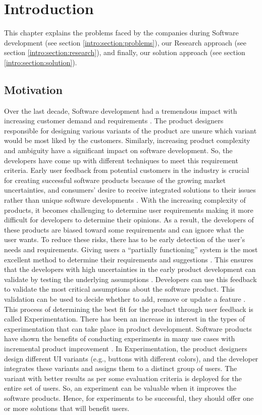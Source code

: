 \chapter{Introduction} \label{chap:intro}
This chapter explains the problems faced by the companies during Software development (see section \ref{intro:section:problems}), our Research approach (see section \ref{intro:section:research}), and finally, our solution approach (see section \ref{intro:section:solution}).

\section{Motivation}
Over the last decade, Software development had a tremendous impact with increasing customer demand and requirements \cite{article:swdemand:ahmed}. 
The product designers responsible for designing various variants of the product are unsure which variant would be most liked by the customers.
Similarly, increasing product complexity and ambiguity have a significant impact on software development. 
So, the developers have come up with different techniques to meet this requirement criteria.
Early user feedback from potential customers in the industry is crucial for creating successful software products because of the growing market uncertainties, and consumers' desire to receive integrated solutions to their issues rather than unique software developments \cite{misc:businessmodels:teece}.
With the increasing complexity of products, it becomes challenging to determine user requirements making it more difficult for developers to determine their opinions.
As a result, the developers of these products are biased toward some requirements and can ignore what the user wants. 
To reduce these risks, there has to be early detection of the user's needs and requirements. 
Giving users a ``partially functioning'' system is the most excellent method to determine their requirements and suggestions \cite{journal:prototyping:davis}.
This ensures that the developers with high uncertainties in the early product development can validate by testing the underlying assumptions \cite{misc:lean:steve}.
Developers can use this feedback to validate the most critical assumptions about the software product. 
This validation can be used to decide whether to add, remove or update a feature \cite{article:experiments:lindgren}. 
This process of determining the best fit for the product through user feedback is called Experimentation.
There has been an increase in interest in the types of experimentation that can take place in product development. 
Software products have shown the benefits of conducting experiments in many use cases with incremental product improvement \cite{article:controlled:experiements}.
In Experimentation, the product designers design different UI variants (e.g., buttons with different colors), and the developer integrates these variants and assigns them to a distinct group of users. 
The variant with better results as per some evaluation criteria is deployed for the entire set of users.
So, an experiment can be valuable when it improves the software products.
Hence, for experiments to be successful, they should offer one or more solutions that will benefit users.


